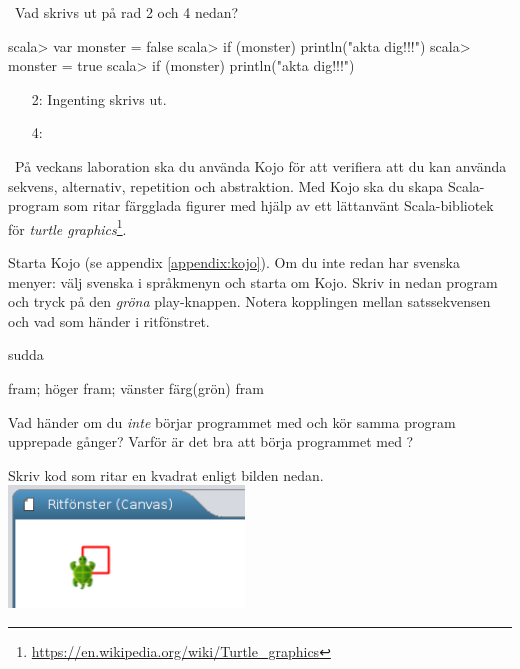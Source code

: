 \SubtaskSolved {}

\QUESTEND






\QUESTBEGIN

\Task \what~Vad skrivs ut på rad 2 och 4 nedan?

\begin{REPL}
scala> var monster = false
scala> if (monster) println("akta dig!!!")
scala> monster = true
scala> if (monster) println("akta dig!!!")
\end{REPL}

\SOLUTION

\TaskSolved \what

\begin{itemize}
\item[2:] Ingenting skrivs ut.
\item[4:] 
\end{itemize}


\QUESTEND







\QUESTBEGIN

\Task \what~På veckans laboration ska du använda Kojo för att verifiera att du kan använda sekvens, alternativ, repetition och abstraktion. Med Kojo ska du skapa Scala-program som ritar färgglada figurer med hjälp av ett lättanvänt Scala-bibliotek för \emph{turtle graphics}\footnote{\url{https://en.wikipedia.org/wiki/Turtle_graphics}}.

Starta Kojo (se appendix \ref{appendix:kojo}). Om du inte redan har svenska menyer: välj svenska i språkmenyn och starta om Kojo.  Skriv in nedan program och tryck på den \emph{gröna} play-knappen. Notera kopplingen mellan satssekvensen och vad som händer i ritfönstret.

\begin{Code}
sudda

fram; höger
fram; vänster
färg(grön)
fram
\end{Code}
\noindent


\Subtask Vad händer om du \emph{inte} börjar programmet med  och kör samma program upprepade gånger? Varför är det bra att börja programmet med ?

\Subtask Skriv kod som ritar en kvadrat enligt bilden nedan.
\vspace{1em}\\\includegraphics[width=0.47\textwidth]{../img/kojo/kvadrat}


